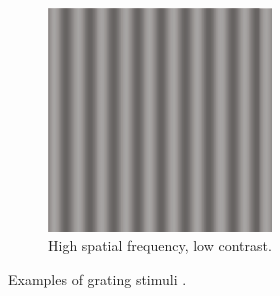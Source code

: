 \begin{figure}[!htp]
\begin{subfigure}[t]{0.3\textwidth}
        \includegraphics[width=0.65\textwidth]{assets/images/grating-stimuli/3.png}
        \caption{High spatial frequency, low contrast.}
    \end{subfigure}
    \caption{Examples of grating stimuli \cite{KandelBook2003:26}.}
    \label{fig:grating-stimuli-examples}
\end{figure}
